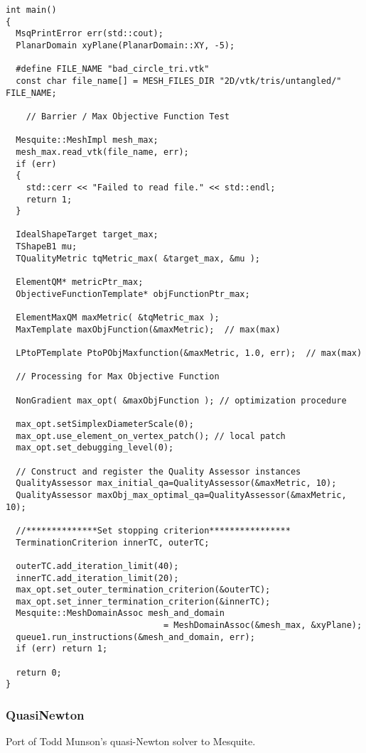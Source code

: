 \begin{lstlisting}[frame=single]
int main()
{
  MsqPrintError err(std::cout);
  PlanarDomain xyPlane(PlanarDomain::XY, -5);

  #define FILE_NAME "bad_circle_tri.vtk"
  const char file_name[] = MESH_FILES_DIR "2D/vtk/tris/untangled/" FILE_NAME;

    // Barrier / Max Objective Function Test

  Mesquite::MeshImpl mesh_max;
  mesh_max.read_vtk(file_name, err);
  if (err)
  {
    std::cerr << "Failed to read file." << std::endl;
    return 1;
  }

  IdealShapeTarget target_max;
  TShapeB1 mu;
  TQualityMetric tqMetric_max( &target_max, &mu );

  ElementQM* metricPtr_max;
  ObjectiveFunctionTemplate* objFunctionPtr_max;

  ElementMaxQM maxMetric( &tqMetric_max );
  MaxTemplate maxObjFunction(&maxMetric);  // max(max)

  LPtoPTemplate PtoPObjMaxfunction(&maxMetric, 1.0, err);  // max(max)

  // Processing for Max Objective Function

  NonGradient max_opt( &maxObjFunction ); // optimization procedure 

  max_opt.setSimplexDiameterScale(0);
  max_opt.use_element_on_vertex_patch(); // local patch
  max_opt.set_debugging_level(0);

  // Construct and register the Quality Assessor instances
  QualityAssessor max_initial_qa=QualityAssessor(&maxMetric, 10);
  QualityAssessor maxObj_max_optimal_qa=QualityAssessor(&maxMetric, 10);

  //**************Set stopping criterion****************
  TerminationCriterion innerTC, outerTC;

  outerTC.add_iteration_limit(40);
  innerTC.add_iteration_limit(20);
  max_opt.set_outer_termination_criterion(&outerTC);
  max_opt.set_inner_termination_criterion(&innerTC);
  Mesquite::MeshDomainAssoc mesh_and_domain 
                               = MeshDomainAssoc(&mesh_max, &xyPlane);
  queue1.run_instructions(&mesh_and_domain, err);
  if (err) return 1;

  return 0;
}

\end{lstlisting}

\subsubsection{QuasiNewton}
Port of Todd Munson's quasi-Newton solver to Mesquite.


